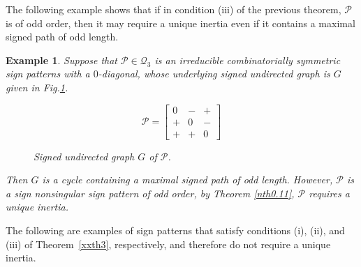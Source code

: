 \documentclass[a4paper, 10pt]{article}
\newtheorem{eg}{Example}[section]
\numberwithin{equation}{section}
\begin{document}
The following example shows that if in condition (iii) of the previous theorem, $\mathcal{P}$ is of odd order, then it may require a unique inertia even if it contains a maximal signed path of odd length.

\begin{eg}\label{xeg1} Suppose that $\mathcal{P}\in \mathcal{Q}_3$ is an irreducible combinatorially symmetric sign patterns with a $0$-diagonal, whose underlying signed undirected graph is $G$ given in Fig.\ref{xfign1.9}.
	\begin{figure}[H]
		\centering
		\begin{minipage}{.45\textwidth}
			\vspace{-1cm}
			\[
			\mathcal{P}=
			\begin{bmatrix}
				0 & - & + \\
				+ & 0 & - \\
				+ & + & 0
			\end{bmatrix}
			\]
		\end{minipage}
		\hspace{0.05\textwidth}
		\begin{minipage}{.45\textwidth}
			\centering
			\tikzset{node distance=1cm}
			\caption{Signed undirected graph $ G$ of $\mathcal{P}$.}
			\label{xfign1.9}
		\end{minipage}
	\end{figure}
	
	Then $G$ is a cycle containing a maximal signed path of odd length. However, $\mathcal{P}$ is a sign nonsingular sign pattern of odd order, by Theorem \ref{nth0.11}, $\mathcal{P}$ requires a unique inertia.
\end{eg}




The following are examples of sign patterns that satisfy conditions (i), (ii), and (iii) of Theorem~\ref{xxth3}, respectively, and therefore do not require a unique inertia.
\end{document}
